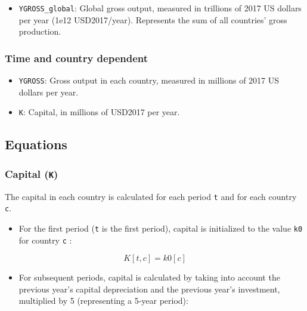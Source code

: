 \documentclass[
]{article}
\providecommand{\tightlist}{%
  \setlength{\itemsep}{0pt}\setlength{\parskip}{0pt}}
\begin{document}
\begin{itemize}
\tightlist
\item
  \texttt{YGROSS\_global}: Global gross output, measured in trillions of
  2017 US dollars per year (1e12 USD2017/year). Represents the sum of all countries'
  gross production.
\end{itemize}

\subsubsection{Time and country
dependent}\label{time-and-country-dependent-7}

\begin{itemize}
\item
  \texttt{YGROSS}: Gross output in each country, measured in millions of
  2017 US dollars per year.
\item
  \texttt{K}: Capital, in millions of USD2017 per year.
\end{itemize}

\subsection{Equations}\label{equations-3}

\subsubsection{\texorpdfstring{Capital
(\texttt{K})}{Capital (K)}}\label{capital-k}

The capital in each country is calculated for each period \texttt{t} and
for each country \texttt{c}.

\begin{itemize}
\tightlist
\item
  For the first period (\texttt{t} is the first period), capital is
  initialized to the value \texttt{k0} for country \texttt{c} :
\end{itemize}

\begin{equation}
 K[t,c] = k0[c]
\end{equation}


\begin{itemize}
\tightlist
\item
  For subsequent periods, capital is calculated by taking into account
  the previous year's capital depreciation and the previous year's
  investment, multiplied by 5 (representing a 5-year period):
\end{itemize}
\end{document}
